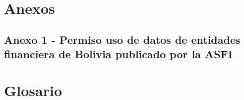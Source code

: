 \documentclass[
  12pt,
]{article}
\begin{document}
\newpage

\hypertarget{anexos}{%
\section{Anexos}\label{anexos}}

\hypertarget{anexo-1---permiso-uso-de-datos-de-entidades-financiera-de-bolivia-publicado-por-la-asfi}{%
\subsection{Anexo 1 - Permiso uso de datos de entidades financiera de
Bolivia publicado por la
ASFI}\label{anexo-1---permiso-uso-de-datos-de-entidades-financiera-de-bolivia-publicado-por-la-asfi}}

\newpage

\hypertarget{glosario}{%
\section{Glosario}\label{glosario}}
\end{document}
